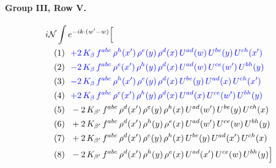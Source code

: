 \documentclass[10pt]{article}
\numberwithin{equation}{section}
\newcommand{\NN}{\mathcal N}
\begin{document}
\paragraph{Group III, Row V.}
\begin{align*}
&i\NN\int e^{-ik\cdot(w'-w)}\Big[\\
&\quad\text{(1)}\ \ \textcolor{blue}{+2\,K_{\beta}\,f^{abc}\,\rho^{h}(x')\,\rho^{e}(y)\,\rho^{d}(x)\,U^{ad}(w)\,U^{be}(y)\,U^{ch}(x')}\\
&\quad\text{(2)}\ \ \textcolor{blue}{-2\,K_{\beta}\,f^{abc}\,\rho^{e}(x')\,\rho^{h}(y)\,\rho^{d}(x)\,U^{ad}(w)\,U^{ce}(w')\,U^{bh}(y)}\\
&\quad\text{(3)}\ \ \textcolor{blue}{-2\,K_{\beta}\,f^{abc}\,\rho^{h}(x')\,\rho^{e}(y)\,\rho^{d}(x)\,U^{be}(y)\,U^{ad}(x)\,U^{ch}(x')}\\
&\quad\text{(4)}\ \ \textcolor{blue}{+2\,K_{\beta}\,f^{abc}\,\rho^{e}(x')\,\rho^{h}(y)\,\rho^{d}(x)\,U^{ad}(x)\,U^{ce}(w')\,U^{bh}(y)}\\
&\quad\text{(5)}\ \ -2\,K_{\beta'}\,f^{abc}\,\rho^{d}(x')\,\rho^{e}(y)\,\rho^{h}(x)\,U^{ad}(w')\,U^{be}(y)\,U^{ch}(x)\\
&\quad\text{(6)}\ \ +2\,K_{\beta'}\,f^{abc}\,\rho^{d}(x')\,\rho^{h}(y)\,\rho^{e}(x)\,U^{ad}(w')\,U^{ce}(w)\,U^{bh}(y)\\
&\quad\text{(7)}\ \ +2\,K_{\beta'}\,f^{abc}\,\rho^{d}(x')\,\rho^{e}(y)\,\rho^{h}(x)\,U^{be}(y)\,U^{ad}(x')\,U^{ch}(x)\\
&\quad\text{(8)}\ \ -2\,K_{\beta'}\,f^{abc}\,\rho^{d}(x')\,\rho^{h}(y)\,\rho^{e}(x)\,U^{ad}(x')\,U^{ce}(w)\,U^{bh}(y)\Big]
\end{align*}
\end{document}
